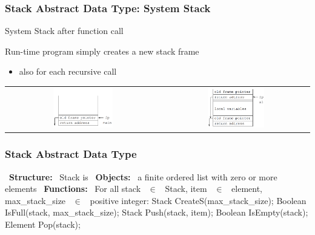 \documentclass[newPxFont,sthlmFooter,nooffset]{beamer}
\begin{document}
\begin{frame}[t]
  \frametitle{Stack Abstract Data Type: System Stack}
System Stack after function call

{ Run-time program simply creates a new stack frame
  \begin{itemize}
  \item also for each recursive call
  \end{itemize}
}

  \begin{center}
    \begin{tabular}{!{}c<{}c}
      \includegraphics[width=0.4\textwidth]{figures/fig03_stack1.png} &
      \includegraphics[width=0.4\textwidth]{figures/fig03_stack2.png} \\
    \end{tabular}
  \end{center}

\end{frame}


\begin{frame}[t,fragile]
  \frametitle{Stack Abstract Data Type}
\begin{codedef}
~\textbf{Structure:}~    Stack is 
   ~\textbf{Objects:}~ a finite ordered list with zero or more elements
   ~\textbf{Functions:}~
   For all stack ~$\in$~ Stack, 
   item ~$\in$~ element,
   max_stack_size ~$\in$~ positive integer:
       Stack CreateS(max_stack_size);
       Boolean IsFull(stack, max_stack_size);
       Stack Push(stack, item);
       Boolean IsEmpty(stack);
       Element Pop(stack); 
\end{codedef}
\end{frame}
\end{document}
